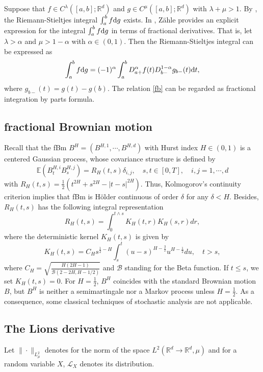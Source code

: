 \documentclass[12pt]{article}
\newcommand{\ra}{\rightarrow}
\def\L{\mathscr{L}}
\def\R{\mathbb R}
\def\d{\text{\rm{d}}}
\numberwithin{equation}{section}
\begin{document}
	Suppose that $f\in C^\lambda([a,b];\R^d)$ and $g\in C^\mu([a,b];\R^d)$ with $\lambda+\mu>1$.
	By \cite{Young36a}, the Riemann-Stieltjes integral $\int_a^bf\d g$ exists.
	In \cite{Zahle}, Z\"{a}hle provides an explicit expression for the integral $\int_a^bf\d g$ in terms of fractional derivatives.
	That is, let $\lambda>\alpha$ and $\mu>1-\alpha$ with $\alpha\in(0,1)$.
	Then the Riemann-Stieltjes integral can be expressed as
	\begin{align}\label{fb}
		\int_a^bf\d g=(-1)^\alpha\int_a^bD_{a+}^\alpha f(t)D_{b-}^{1-\alpha}g_{b-}(t)\d t,
	\end{align}
	where $g_{b-}(t)=g(t)-g(b)$.
	The relation \eqref{fb} can be regarded as fractional integration by parts formula.
	
	\subsection{fractional Brownian motion}
	Recall that the fBm $B^{H}=(B^{H,1},\cdots,B^{H,d})$  with Hurst index $H\in
	(0,1)$  is a centered Gaussian process, whose covariance structure is defined by
	$$\mathbb{E}(B_{t}^{H,i}B_{s}^{H,j})=R_{H}(t,s)\delta_{i,j},\quad s,t\in[0,T],\quad i,j=1,\cdots,d$$
	with $R_{H}(t,s)=\frac{1}{2}(t^{2H}+s^{2H}-|t-s|^{2H})$.
	Thus, Kolmogorov's continuity criterion implies that fBm is H\"{o}lder continuous of order $\delta$ for any $\delta<H.$
	Besides, $R_{H} (t, s)$ has the following integral representation
	$$R_{H}(t,s)=\int_{0}^{t\wedge s}K_{H}(t,r)K_{H}(s,r)dr,$$
	where the deterministic kernel $K_{H}(t,s)$ is   given by
	$$K_{H}(t,s)=C_{H}s^{\frac{1}{2}-H}\int_{s}^{t}(u-s)^{H-\frac{3}{2}}u^{H-\frac{1}{2}}du,\quad t>s,$$
	where $C_{H}=\sqrt{\frac{H(2H-1)}{\mathcal{B}(2-2H,H-1/2)}}$ and $\mathcal{B}$ standing for the Beta function. If $t\leq s$, we set $K_{H}(t,s)=0$.
	For
	$H=\frac1 2$, $B^H$ coincides with the standard Brownian motion $B$, but
	$B^H$ is neither a semimartingale nor a Markov process unless
	$H=\frac 12$. As a consequence, some classical techniques of stochastic
	analysis are not applicable.
	
	\subsection{The Lions derivative}
	Let $\|\cdot\|_{L^2_\mu}$ denotes for the norm of the space $ L^2(\R^d\ra\R^d,\mu)$ and for a random variable $X$, $\L_X$ denotes its distribution.
	
\end{document}
